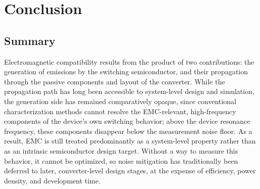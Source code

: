 \chapter{Conclusion}    
\label{ch:Conclusion}

\section*{Summary}

Electromagnetic compatibility results from the product of two contributions: the generation of emissions by the switching semiconductor, and their propagation through the passive components and layout of the converter.
While the propagation path has long been accessible to system-level design and simulation, the generation side has remained comparatively opaque, since conventional characterization methods cannot resolve the EMC-relevant, high-frequency components of the device's own switching behavior; above the device resonance frequency, these components disappear below the measurement noise floor.
As a result, EMC is still treated predominantly as a system-level property rather than as an intrinsic semiconductor design target.
Without a way to measure this behavior, it cannot be optimized, so noise mitigation has traditionally been deferred to later, converter-level design stages, at the expense of efficiency, power density, and development time.


